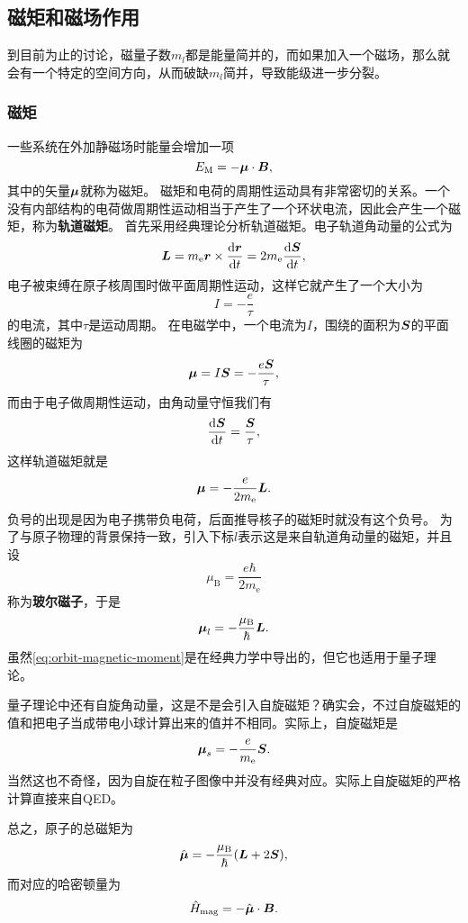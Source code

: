 \documentclass[UTF8, a4paper]{ctexart}
\begin{document}
\subsection{磁矩和磁场作用}

到目前为止的讨论，磁量子数$m_l$都是能量简并的，而如果加入一个磁场，那么就会有一个特定的空间方向，从而破缺$m_l$简并，导致能级进一步分裂。

\subsubsection{磁矩}

一些系统在外加静磁场时能量会增加一项
\[
    E_\text{M} = - \vb*{\mu} \cdot \vb*{B},
\]
其中的矢量$\vb*{\mu}$就称为磁矩。
磁矩和电荷的周期性运动具有非常密切的关系。一个没有内部结构的电荷做周期性运动相当于产生了一个环状电流，因此会产生一个磁矩，称为\textbf{轨道磁矩}。
首先采用经典理论分析轨道磁矩。电子轨道角动量的公式为
\[
    \vb*{L} = m_\text{e} \vb*{r} \times \dv{\vb*{r}}{t} = 2 m_\text{e} \dv{\vb*{S}}{t},
\]
电子被束缚在原子核周围时做平面周期性运动，这样它就产生了一个大小为
\[
    I = - \frac{e}{\tau}
\]
的电流，其中$\tau$是运动周期。
在电磁学中，一个电流为$I$，围绕的面积为$\vb*{S}$的平面线圈的磁矩为
\[
    \vb*{\mu} = I \vb*{S} = - \frac{e \vb*{S}}{\tau},
\]
而由于电子做周期性运动，由角动量守恒我们有
\[
    \dv{\vb*{S}}{t} = \frac{\vb*{S}}{\tau},
\]
这样轨道磁矩就是
\[
    \vb*{\mu} = - \frac{e}{2m_\text{e}} \vb*{L}.
\]
负号的出现是因为电子携带负电荷，后面推导核子的磁矩时就没有这个负号。
为了与原子物理的背景保持一致，引入下标$l$表示这是来自轨道角动量的磁矩，并且设
\begin{equation}
    \mu_\text{B} = \frac{e\hbar}{2m_\text{e}}
\end{equation}
称为\textbf{玻尔磁子}，于是
\begin{equation}
    \vb*{\mu}_l = - \frac{\mu_\text{B}}{\hbar} \vb*{L}.
    \label{eq:orbit-magnetic-moment}
\end{equation}
虽然\eqref{eq:orbit-magnetic-moment}是在经典力学中导出的，但它也适用于量子理论。

量子理论中还有自旋角动量，这是不是会引入自旋磁矩？确实会，不过自旋磁矩的值和把电子当成带电小球计算出来的值并不相同。实际上，自旋磁矩是
\begin{equation}
    \vb*{\mu}_s = - \frac{e}{m_\text{e}} \vb*{S}.
\end{equation}
当然这也不奇怪，因为自旋在粒子图像中并没有经典对应。实际上自旋磁矩的严格计算直接来自QED。

总之，原子的总磁矩为
\begin{equation}
    \hat{\vb*{\mu}} = - \frac{\mu_\text{B}}{\hbar} (\vb*{L} + 2\vb*{S}),
\end{equation}
而对应的哈密顿量为
\begin{equation}
    \hat{H}_\text{mag} = - \hat{\vb*{\mu}} \cdot \vb*{B}.
    \label{eq:magnetic-hamiltonian}
\end{equation}
\end{document}
